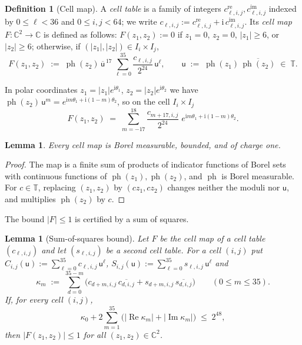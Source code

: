 \documentclass[11pt,reqno]{amsart}
\newtheorem{lemma}[theorem]{Lemma}
\theoremstyle{definition}
\newtheorem{definition}[theorem]{Definition}
\numberwithin{equation}{section}
\newcommand{\C}{\mathbb{C}}
\newcommand{\T}{\mathbb{T}}
\newcommand{\ph}{\operatorname{ph}}
\newcommand{\ii}{\mathrm{i}}
\DeclareMathOperator{\RePart}{Re}
\DeclareMathOperator{\ImPart}{Im}
\begin{document}
\begin{definition}[Cell map]\label{def:cellmap}
A \emph{cell table} is a family of integers $c^{\mathrm{re}}_{\ell,i,j}, c^{\mathrm{im}}_{\ell,i,j}$ indexed by $0 \le \ell < 36$ and $0\le i,j<64$; we write $c_{\ell,i,j}:=c^{\mathrm{re}}_{\ell,i,j} + \ii\, c^{\mathrm{im}}_{\ell,i,j}$. Its \emph{cell map} $F:\C^2\to\C$ is defined as follows: $F(z_1, z_2) := 0$ if $z_1 = 0$, $z_2 = 0$, $|z_1| \ge 6$, or $|z_2| \ge 6$; otherwise, if $(|z_1|, |z_2|) \in I_i \times I_j$,
\begin{equation}\label{eq:cell-fn}
  F(z_1, z_2) \;:=\; \ph(z_2)\, \overline{\mathsf{u}}^{\,17}\, \sum_{\ell=0}^{35} \frac{c_{\ell,i,j}}{2^{24}}\, \mathsf{u}^\ell,
  \qquad \mathsf{u} \;:=\; \ph(z_1)\,\overline{\ph(z_2)} \;\in\; \T .
\end{equation}
\end{definition}

In polar coordinates $z_1=|z_1|e^{\ii\theta_1}$, $z_2=|z_2|e^{\ii\theta_2}$ we have $\ph(z_2)\,\mathsf{u}^m=e^{\ii m\theta_1+\ii(1-m)\theta_2}$, so on the cell $I_i\times I_j$
\begin{equation}\label{eq:cell-fourier}
  F(z_1,z_2)\;=\;\sum_{m=-17}^{18}\frac{c_{m+17,i,j}}{2^{24}}\;e^{\ii m\theta_1+\ii(1-m)\theta_2} .
\end{equation}

\begin{lemma}\label{lem:cell-basic}
Every cell map is Borel measurable, bounded, and of charge one.
\end{lemma}

\begin{proof}
The map is a finite sum of products of indicator functions of Borel sets with continuous functions of $\ph(z_1),\ph(z_2)$, and $\ph$ is Borel measurable. For $c\in\T$, replacing $(z_1,z_2)$ by $(cz_1,cz_2)$ changes neither the moduli nor $\mathsf{u}$, and multiplies $\ph(z_2)$ by $c$.
\end{proof}

The bound $|F|\le1$ is certified by a sum of squares.

\begin{lemma}[Sum-of-squares bound]\label{lem:sos}
Let $F$ be the cell map of a cell table $(c_{\ell,i,j})$ and let $(s_{\ell,i,j})$ be a second cell table. For a cell $(i,j)$ put $C_{i,j}(\mathsf{u}) := \sum_{\ell=0}^{35} c_{\ell,i,j}\, \mathsf{u}^\ell$, $S_{i,j}(\mathsf{u}) := \sum_{\ell=0}^{35} s_{\ell,i,j}\, \mathsf{u}^\ell$ and
\[
  \kappa_m \;:=\; \sum_{d=0}^{35-m} \bigl(c_{d+m,i,j}\,\overline{c_{d,i,j}} + s_{d+m,i,j}\,\overline{s_{d,i,j}}\bigr)\qquad(0\le m\le35).
\]
If, for every cell $(i,j)$,
\begin{equation}\label{eq:sos-cond}
  \kappa_0 + 2 \sum_{m=1}^{35} \big(|\RePart \kappa_m| + |\ImPart \kappa_m|\big) \;\le\; 2^{48},
\end{equation}
then $|F(z_1, z_2)| \le 1$ for all $(z_1,z_2)\in\C^2$.
\end{lemma}
\end{document}
